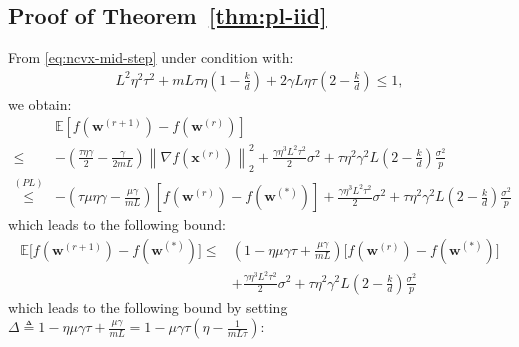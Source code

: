 \documentclass[review,onefignum,onetabnum]{siamart190516}
\begin{document}
\subsection{Proof of Theorem~\ref{thm:pl-iid}}
From \eqref{eq:ncvx-mid-step} under condition with:
\begin{align}
       L^2\eta^2\tau^2+mL\tau\eta\left(1-\frac{k}{d}\right)+2\gamma L\eta\tau\left(2-\frac{k}{d}\right)\leq 1, \label{eq:step_size_cnd_mmr}
\end{align}
we obtain:
\begin{align}
        & \mathbb{E}\left[f({\boldsymbol{w}}^{(r+1)})-f({\boldsymbol{w}}^{(r)})\right]\\
        \leq& -\left(\frac{\tau\eta\gamma}{2}-\frac{\gamma}{2mL}\right)\left\|\nabla f({\boldsymbol{x}}^{(r)})\right\|_2^2+\frac{\gamma\eta^3L^2\tau^2}{2}\sigma^2+\tau\eta^2\gamma^2 L\left(2-\frac{k}{d}\right)\frac{\sigma^2}{p}\nonumber\\
         \stackrel{(PL)}{\leq}&-\left({\tau\mu\eta\gamma}-\frac{\mu\gamma}{mL}\right)\left[f({\boldsymbol{w}}^{(r)})-f({\boldsymbol{w}}^{(*)})\right]+\frac{\gamma\eta^3L^2\tau^2}{2}\sigma^2+\tau\eta^2\gamma^2 L\left(2-\frac{k}{d}\right)\frac{\sigma^2}{p} 
\end{align}
which leads to the following bound:
\begin{align}
            \mathbb{E}\Big[f({\boldsymbol{w}}^{(r+1)})-f({\boldsymbol{w}}^{(*)})\Big]\leq & \left(1-\eta\mu\gamma{\tau}+\frac{\mu\gamma}{mL}\right) \Big[f({\boldsymbol{w}}^{(r)})-f({\boldsymbol{w}}^{(*)})\Big]\\
            &+\frac{\gamma\eta^3L^2\tau^2}{2}\sigma^2+\tau\eta^2\gamma^2 L\left(2-\frac{k}{d}\right)\frac{\sigma^2}{p} 
\end{align}
which leads to the following bound by setting $\Delta\triangleq1-\eta\mu\gamma{\tau}+\frac{\mu\gamma}{mL}=1-\mu\gamma\tau\left(\eta-\frac{1}{mL\tau}\right)$:
\end{document}
